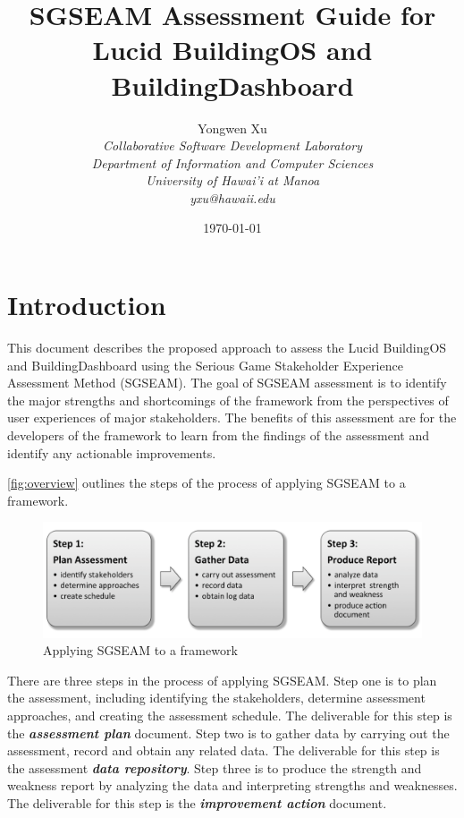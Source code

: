\documentclass[11pt,oneside]{book}
\title{SGSEAM Assessment Guide for Lucid BuildingOS and BuildingDashboard}
\author{
	 Yongwen Xu \\
\em  Collaborative Software Development Laboratory \\
\em  Department of Information and Computer Sciences \\
\em  University of Hawai'i at Manoa\\
     yxu@hawaii.edu \\
}
\date{\today}
\begin{document}
\maketitle

\newpage

\tableofcontents
\newpage

\chapter{Introduction}
This document describes the proposed approach to assess the Lucid BuildingOS and BuildingDashboard using the Serious Game Stakeholder Experience Assessment Method (SGSEAM). The goal of SGSEAM assessment is to identify the major strengths and shortcomings of the framework from the perspectives of user experiences of major stakeholders. The benefits of this assessment are for the developers of the framework to learn from the findings of the assessment and identify any actionable improvements.
\newline

\autoref{fig:overview} outlines the steps of the process of applying SGSEAM to a framework.

\begin{figure}[ht!]
  \center
  \includegraphics[width=0.8\columnwidth]{sgseam-steps}
  \caption{Applying SGSEAM to a framework}
  \label{fig:overview}
\end{figure}

There are three steps in the process of applying SGSEAM. Step one is to plan the assessment, including
 identifying the stakeholders, determine assessment approaches, and creating the assessment schedule. 
 The deliverable for this step is the \textbf{\textit{assessment plan}} document. Step two is to gather data by carrying out 
 the assessment, record and obtain any related data. The deliverable for this step is the 
 assessment \textbf{\textit{data repository}}. Step three is to produce the strength and weakness report by analyzing 
 the data and interpreting strengths and weaknesses. The deliverable for this step is the \textbf{\textit{improvement action}} document.
 \newline
\end{document}
